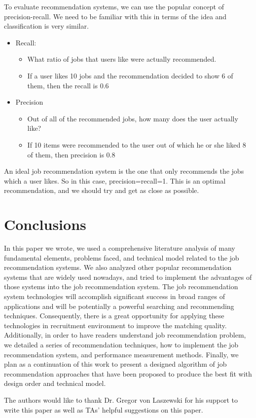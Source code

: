 \documentclass[sigconf]{acmart}
\begin{document}
To evaluate recommendation systems, we can use the popular concept of precision-recall. We need to be familiar with this in terms of the idea and classification is very similar. 

\begin{itemize}
  \item Recall:
    \begin{itemize}
    \item 
    What ratio of jobs that users like were actually recommended.

    \item If a user likes 10 jobs and the recommendation decided to show 6 of them, then the recall is 0.6

    \end{itemize}

  \item Precision
    \begin{itemize}
    \item 
    Out of all of the recommended jobs, how many does the user actually like?

    \item If 10 items were recommended to the user out of which he or she liked 8 of them, then precision is 0.8

    \end{itemize}

\end{itemize}

\par An ideal job recommendation system is the one that only recommends the jobs which a user likes. So in this case, precision=recall=1. This is an optimal recommendation, and we should try and get as close as possible.

\section{Conclusions}
 In this paper we wrote, we used a comprehensive literature analysis of many fundamental elements, problems faced, and technical model related to the job recommendation systems. We also analyzed other popular recommendation systems that are widely used nowadays, and tried to implement the advantages of those systems into the job recommendation system. The job recommendation system technologies will accomplish significant success in broad ranges of applications and will be potentially a powerful searching and recommending techniques. Consequently, there is a great opportunity for applying these technologies in recruitment environment to improve the matching quality. Additionally, in order to have readers understand job recommendation problem, we detailed a series of recommendation techniques, how to implement the job recommendation system, and performance measurement methods. Finally, we plan as a continuation of this work to present a designed algorithm of job recommendation approaches that have been proposed to produce the best fit with design order and technical model. 

\begin{acks}

The authors would like to thank Dr. Gregor von Laszewski for his support to write this paper as well as TAs' helpful suggestions on this paper. 

\end{acks}




 
\end{document}
